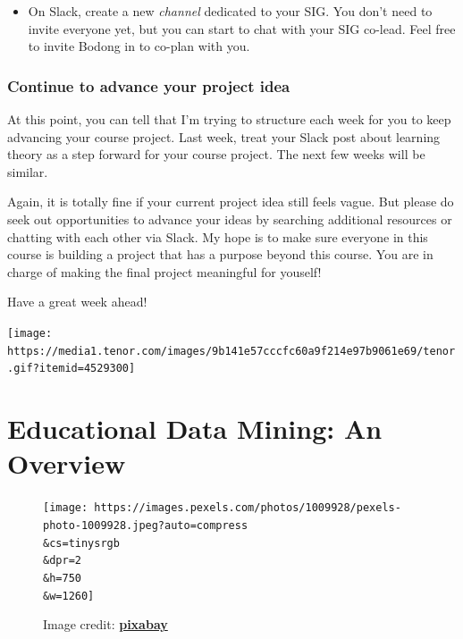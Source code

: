 \documentclass[
]{book}
\providecommand{\tightlist}{%
  \setlength{\itemsep}{0pt}\setlength{\parskip}{0pt}}
\begin{document}
\begin{itemize}
\tightlist
\item
  On Slack, create a new \emph{channel} dedicated to your SIG. You don't need to invite everyone yet, but you can start to chat with your SIG co-lead. Feel free to invite Bodong in to co-plan with you.
\end{itemize}

\hypertarget{continue-to-advance-your-project-idea}{%
\subsection{Continue to advance your project idea}\label{continue-to-advance-your-project-idea}}

At this point, you can tell that I'm trying to structure each week for you to keep advancing your course project. Last week, treat your Slack post about learning theory as a step forward for your course project. The next few weeks will be similar.

Again, it is totally fine if your current project idea still feels vague. But please do seek out opportunities to advance your ideas by searching additional resources or chatting with each other via Slack. My hope is to make sure everyone in this course is building a project that has a purpose beyond this course. You are in charge of making the final project meaningful for youself!

Have a great week ahead!

\texttt{[image: https://media1.tenor.com/images/9b141e57cccfc60a9f214e97b9061e69/tenor.gif?itemid=4529300]}

\hypertarget{educational-data-mining-an-overview}{%
\chapter{Educational Data Mining: An Overview}\label{educational-data-mining-an-overview}}

\begin{figure}
\centering
\texttt{[image: https://images.pexels.com/photos/1009928/pexels-photo-1009928.jpeg?auto=compress\\\&cs=tinysrgb\\\&dpr=2\\\&h=750\\\&w=1260]}
\caption{Image credit: \href{https://www.pexels.com/photo/yellow-heavy-equipment-1009928/}{\textbf{pixabay}}}
\end{figure}
\end{document}
